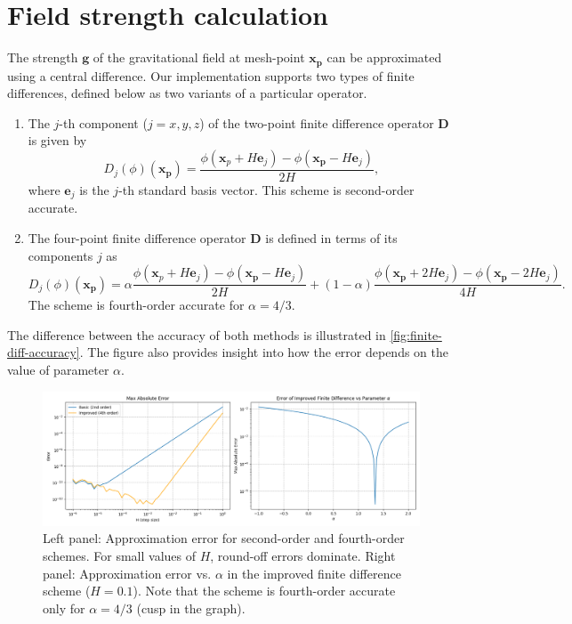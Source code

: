 \section{Field strength calculation}
The strength $\mathbf{g}$ of the gravitational field at mesh-point $\mathbf{x}_\mathbf{p}$ can be approximated using a central difference.
Our implementation supports two types of finite differences, defined below as two variants of a particular operator.
\begin{enumerate}
    \item The $j$-th component ($j = x, y, z$) of the two-point finite difference operator $\mathbf{D}$ is given by
          \begin{equation}\label{eq:two-point-central-diff-def-1}
              D_j(\phi)(\mathbf{x}_\mathbf{p}) = \frac{\phi(\mathbf{x}_{p} + H\mathbf{e}_j) - \phi(\mathbf{x}_\mathbf{p} - H\mathbf{e}_j)}{2H},
          \end{equation}
          where $\mathbf{e}_j$ is the $j$-th standard basis vector.
          This scheme is second-order accurate.
    \item The four-point finite difference operator $\mathbf{D}$ is defined in terms of its components $j$ as
          \begin{equation*}
              D_j(\phi)(\mathbf{x}_\mathbf{p}) = \alpha\frac{\phi(\mathbf{x}_{p} + H\mathbf{e}_j) - \phi(\mathbf{x}_\mathbf{p} - H\mathbf{e}_j)}{2H} + (1-\alpha)\frac{\phi(\mathbf{x}_\mathbf{p} + 2H\mathbf{e}_j) - \phi(\mathbf{x}_\mathbf{p} - 2H\mathbf{e}_j)}{4H}.
          \end{equation*}
          The scheme is fourth-order accurate for $\alpha = 4/3$.
\end{enumerate}

The difference between the accuracy of both methods is illustrated in \autoref{fig:finite-diff-accuracy}.
The figure also provides insight into how the error depends on the value of parameter $\alpha$.
\begin{figure}[htp]
    \centering
    \includegraphics[scale=0.43]{chapters/pm-method/img/finite-difference.png}
    \caption{Left panel: Approximation error for second-order and fourth-order schemes.
        For small values of $H$, round-off errors dominate.
        Right panel: Approximation error vs. $\alpha$ in the improved finite difference scheme ($H = 0.1$).
        Note that the scheme is fourth-order accurate only for $\alpha = 4/3$ (cusp in the graph).}
    \label{fig:finite-diff-accuracy}
\end{figure}

